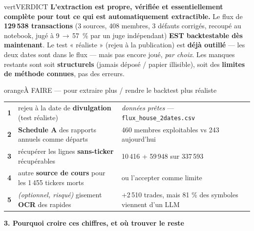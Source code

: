 \documentclass[10pt,a4paper]{article}
\begin{document}
\begin{bloc}{vert}{VERDICT}
\footnotesize
\textbf{L'extraction est propre, vérifiée et essentiellement complète pour tout ce qui est automatiquement
extractible.} Le flux de \textbf{129\,538 transactions} (3 sources, 408 membres, 3 défauts corrigés, recoupé
au notebook, jugé à 9\,$\rightarrow$\,57~\% par un juge indépendant) \textbf{EST backtestable dès maintenant}.
Le test « réaliste » (rejeu à la publication) est \textbf{déjà outillé} --- les deux dates sont dans le flux ---
mais pas encore joué, \emph{par choix}. Les manques restants sont soit \textbf{structurels} (jamais déposé /
papier illisible), soit des \textbf{limites de méthode connues}, pas des erreurs.
\end{bloc}

\begin{bloc}{orange}{À FAIRE --- pour extraire plus / rendre le backtest plus réaliste}
\footnotesize
\begin{tabular}{@{}r l l@{}}
\textbf{1} & rejeu à la date de \textbf{divulgation} (test réaliste) & \emph{données prêtes} --- \texttt{flux\_house\_2dates.csv}\\
\textbf{2} & \textbf{Schedule A} des rapports annuels comme départs & 460 membres exploitables vs 243 aujourd'hui\\
\textbf{3} & récupérer les lignes \textbf{sans-ticker} récupérables & 10\,416 + 59\,948 sur 337\,593\\
\textbf{4} & autre \textbf{source de cours} pour les 1\,455 tickers morts & ou l'accepter comme limite\\
\textbf{5} & \emph{(optionnel, risqué)} gisement \textbf{OCR} des rapides & +2\,510 trades, mais 81 \% des symboles viennent d'un LLM\\
\end{tabular}
\end{bloc}

\newpage

\begin{center}{\large\bfseries 3. Pourquoi croire ces chiffres, et où trouver le reste}\end{center}
\vspace{1mm}
\end{document}
